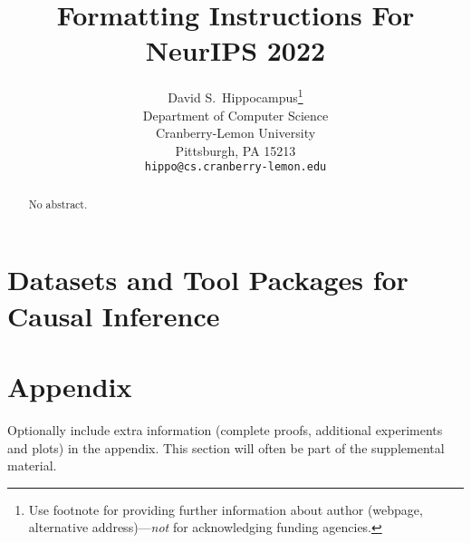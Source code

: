 \documentclass{article}
\title{Formatting Instructions For NeurIPS 2022}
\author{%
    David S.~Hippocampus\thanks{Use footnote for providing further information
    about author (webpage, alternative address)---\emph{not} for acknowledging
    funding agencies.} \\
    Department of Computer Science\\
    Cranberry-Lemon University\\
    Pittsburgh, PA 15213 \\
    \texttt{hippo@cs.cranberry-lemon.edu} \\
}
\begin{document}
    \maketitle


    \begin{abstract}
        No abstract.
    \end{abstract}


    \section{Datasets and Tool Packages for Causal Inference}\label{sec:datasets-and-tool-packages-for-causal-inference}

    



    \newpage
    {\small
    
    
    }




    \appendix


    \section{Appendix}


    Optionally include extra information (complete proofs, additional experiments and plots) in the appendix.
    This section will often be part of the supplemental material.
\end{document}
